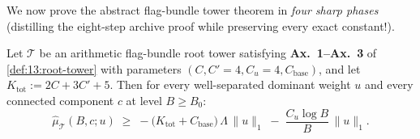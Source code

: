 We now prove the abstract flag-bundle tower theorem in \emph{four sharp phases} (distilling the eight-step archive proof while preserving every exact constant!).

\begin{proposition}
\label{prop:13:tower-engine}
Let $\mathcal{T}$ be an arithmetic flag-bundle root tower satisfying \textbf{Ax.~1--Ax.~3} of \cref{def:13:root-tower} with parameters $(C, C' = 4, C_u = 4, C_{\mathrm{base}})$, and let $K_{\mathrm{tot}} := 2C + 3C' + 5$. Then for every well-separated dominant weight $u$ and every connected component $c$ at level $B \ge B_0$:
\begin{equation}
\label{eq:13:tower-engine}
  \widehat{\mu}_{\mathcal{T}}(B, c; u)
  \;\ge\; -\bigl(K_{\mathrm{tot}} + C_{\mathrm{base}}\bigr)\,\Lambda\,\|u\|_1 \;-\; \frac{C_u \log B}{B}\,\|u\|_1.
\end{equation}
\end{proposition}

